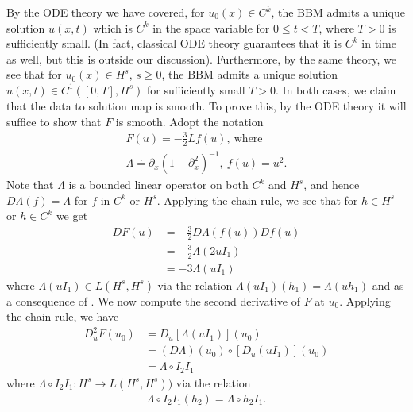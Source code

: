 \documentclass[12pt,reqno]{amsart}
\numberwithin{equation}{section}  %
\newcommand{\p}{\partial}
\renewcommand{\cref}{\Cref} %
\begin{document}
%
%
%
%
%
%
By the ODE theory we have covered, for $u_{0}(x) \in C^{k}$, the BBM admits a
unique solution $u(x,t)$ which is $C^{k}$ in the space variable for $0\le t <
T$, where $T > 0$ is sufficiently small. (In fact, classical ODE theory
guarantees that it is $C^{k}$ in time as well, but this is outside our
discussion). Furthermore, by the same theory, we see that for $u_{0}(x) \in
H^{s}$, $s \ge 0$, the BBM admits a unique solution $u(x,t) \in C^{1}([0, T],
H^{s})$ for sufficiently small $T > 0$. In both cases, we claim that the data to
solution map is smooth. To prove this, by the ODE theory it will suffice to show
that $F$ is smooth. Adopt
the notation
\begin{gather*}
F(u) = -\frac{3}{2}Lf(u), \ \text{where} \ 
\\
\Lambda \doteq \p_{x}(1 - \p_{x}^{2})^{-1}, \ f(u) = u^{2}.
\end{gather*}
Note that $\Lambda$ is a bounded linear operator on both $C^{k}$ and $H^{s}$,
and hence $D \Lambda(f) = \Lambda$ for $f$ in $C^{k}$ or $H^{s}$. Applying the chain
rule, we see that for $h \in H^{s}$ or $h \in C^{k}$ we get
%
%
\begin{equation*}
\begin{split}
DF(u) & = -\frac{3}{2}D \Lambda (f(u))Df(u)\\
& = -\frac{3}{2} \Lambda (2uI_{1})
\\
& = -3 \Lambda (uI_{1})
\end{split}
\end{equation*}
%
%
where $\Lambda (uI_{1}) \in L(H^{s}, H^{s})$ via the relation
$\Lambda (uI_{1})(h_{1}) = \Lambda (u h_{1})$ and as a consequence of 
\cref{lem:bbm-bilin-est}. 
%
We now compute the second derivative of $F$ at $u_{0}$. Applying the chain rule, we have
%
%
\begin{equation*}
\begin{split}
D^{2}_{u}F(u_{0}) 
& = D_{u} \left[ \Lambda (u I_{1}) \right](u_{0})
\\
& = (D \Lambda)(u_{0}) \circ \left[ D_{u}(u I_{1}) \right](u_{0})
\\
& = \Lambda \circ I_{2}I_{1}
\end{split}
\end{equation*}
%
%
where $\Lambda \circ I_{2} I_{1}: H^{s} \to L(H^{s}, H^{s}))$ via the
relation
%
%
\begin{equation*}
\begin{split}
\Lambda \circ I_{2} I_{1} (h_{2}) = \Lambda \circ h_{2} I_{1}.
\end{split}
\end{equation*}
\end{document}
